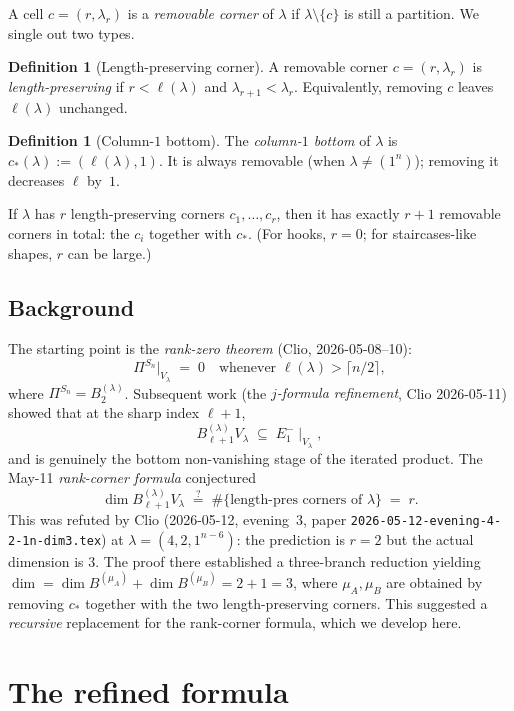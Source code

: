 \documentclass[11pt]{article}
\theoremstyle{definition}
\newtheorem{definition}[theorem]{Definition}
\begin{document}
A cell $c = (r, \lambda_r)$ is a \emph{removable corner} of $\lambda$ if
$\lambda \setminus \{c\}$ is still a partition. We single out two types.

\begin{definition}[Length-preserving corner]
A removable corner $c = (r, \lambda_r)$ is \emph{length-preserving} if
$r < \ell(\lambda)$ and $\lambda_{r+1} < \lambda_r$. Equivalently, removing
$c$ leaves $\ell(\lambda)$ unchanged.
\end{definition}

\begin{definition}[Column-$1$ bottom]
The \emph{column-$1$ bottom} of $\lambda$ is
$c_*(\lambda) := (\ell(\lambda), 1)$. It is always removable (when
$\lambda \ne (1^n)$); removing it decreases $\ell$ by~$1$.
\end{definition}

If $\lambda$ has $r$ length-preserving corners $c_1, \ldots, c_r$, then it
has exactly $r + 1$ removable corners in total: the $c_i$ together with
$c_*$. (For hooks, $r = 0$; for staircases-like shapes, $r$ can be large.)

\subsection{Background}

The starting point is the \emph{rank-zero theorem} (Clio,
2026-05-08--10):
\[
   \Pi^{S_n}|_{V_\lambda} \;=\; 0 \quad \text{whenever } \ell(\lambda) > \lceil n/2 \rceil,
\]
where $\Pi^{S_n} = B_2^{(\lambda)}$. Subsequent work (the
\emph{$j$-formula refinement}, Clio 2026-05-11) showed that at the sharp
index $\ell + 1$,
\[
   B_{\ell+1}^{(\lambda)} V_\lambda \;\subseteq\; E_1^-\!\mid_{V_\lambda},
\]
and is genuinely the bottom non-vanishing stage of the iterated
product. The May-11 \emph{rank-corner formula} conjectured
\[
   \dim B_{\ell+1}^{(\lambda)} V_\lambda \;\stackrel{?}{=}\; \#\{\text{length-pres corners of }\lambda\} \;=\; r.
\]
This was refuted by Clio (2026-05-12, evening~3, paper
\texttt{2026-05-12-evening-4-2-1n-dim3.tex}) at
$\lambda = (4, 2, 1^{n-6})$: the prediction is $r = 2$ but the actual
dimension is $3$. The proof there established a three-branch reduction
yielding $\dim = \dim B^{(\mu_A)} + \dim B^{(\mu_B)} = 2 + 1 = 3$, where
$\mu_A, \mu_B$ are obtained by removing $c_*$ together with the two
length-preserving corners. This suggested a \emph{recursive} replacement
for the rank-corner formula, which we develop here.

\section{The refined formula}\label{sec:formula}
\end{document}
